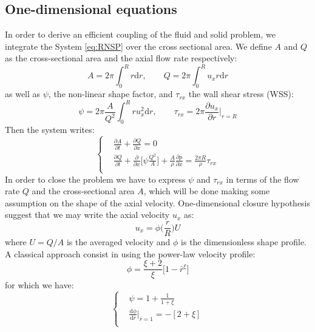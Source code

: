 \documentclass[12pt,a4paper]{article}
\numberwithin{equation}{section}
\begin{document}
\subsection{One-dimensional equations}
In order to derive an efficient coupling of the fluid and solid problem, we integrate the System \ref{eq:RNSP} over the cross sectional area. We define $A$ and $Q$ as the cross-sectional area and the axial flow rate respectively:
\begin{equation}
A = 2\pi\int_0^R r\textrm{d}r, \qquad Q = 2\pi\int_0^R u_xr\textrm{d}r  
\end{equation}
as well as $\psi$, the non-linear shape factor, and $\tau_{rx}$ the wall shear stress (WSS):
\begin{equation}
\psi = 2\pi\frac{A}{Q^2}\int_0^R ru_x^2\textrm{d}r, \qquad \tau_{rx} = 2\pi\frac{\partial u_x}{\partial r}\Big|_{r=R}
\end{equation}
Then the system writes:
\begin{equation}\label{eq:system avant final}
  \left\{
      \begin{aligned}
       & \frac{\partial A}{\partial t} + \frac{\partial Q}{\partial x} = 0\\
       &  \frac{\partial Q}{\partial t} +\frac{\partial}{\partial x}\Bigg[\psi\frac{Q^2}{A}\Bigg]+\frac{A}{\rho}\frac{\partial p}{\partial x} = \frac{2\pi R}{\rho} \tau_{rx} \\
      \end{aligned}
    \right.
\end{equation}
In order to close the problem we have to express $\psi$ and $\tau_{rx}$ in terms of the flow rate $Q$ and the cross-sectional area $A$, which will be done making some assumption on the shape of the axial velocity. One-dimensional closure hypothesis suggest that we may write the axial velocity $u_x$ as:
\begin{equation}
u_x = \phi\Big(\frac{r}{R}\Big)U
\end{equation}
where $U = Q/A$ is the averaged velocity and $\phi$ is the dimensionless shape profile.\\
A classical approach consist in using the power-law velocity profile:
\begin{equation}
\phi = \frac{\xi+2}{\xi} \Big[1-\bar{r}^\xi\Big]
\end{equation}
for which we have:
\begin{equation} \label{eq:power law}
  \left\{
      \begin{aligned}
       & \psi = 1+\frac{1}{1+\xi}\\
       &  \frac{\textrm{d}\phi}{\textrm{d} \bar{r}}\Bigg|_{\bar{r}=1} = -[2+\xi] \\
      \end{aligned}
    \right.
\end{equation}
\end{document}
